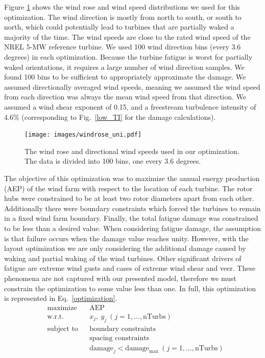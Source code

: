\documentclass[11pt,letterpaper]{article}
\begin{document}
Figure \ref{windrose} shows the wind rose and wind speed distributions we used for this optimization. The wind direction is mostly from north to south, or south to north, which could potentially lead to turbines that are partially waked a majority of the time. The wind speeds are close to the rated wind speed of the NREL 5-MW reference turbine. We used 100 wind direction bins (every 3.6 degrees) in each optimization. Because the turbine fatigue is worst for partially waked orientations, it requires a large number of wind direction samples. We found 100 bins to be sufficient to appropriately approximate the damage. We assumed directionally averaged wind speeds, meaning we assumed the wind speed from each direction was always the mean wind speed from that direction. We assumed a wind shear exponent of 0.15, and a freestream turbulence intensity of 4.6\% (corresponding to Fig.~\ref{low_TI} for the damage calculations).
% 
\begin{figure}
    \centering
    \texttt{[image: images/windrose\_uni.pdf]}
    \caption{The wind rose and directional wind speeds used in our optimization. The data is divided into 100 bins, one every 3.6 degrees.}
    \label{windrose}
\end{figure}


The objective of this optimization was to maximize the annual energy production (AEP) of the wind farm with respect to the location of each turbine. The rotor hubs were constrained to be at least two rotor diameters apart from each other. Additionally there were boundary constraints which forced the turbines to remain in a fixed wind farm boundary. Finally, the total fatigue damage was constrained to be less than a desired value. When considering fatigue damage, the assumption is that failure occurs when the damage value reaches unity. However, with the layout optimization we are only considering the additional damage caused by waking and partial waking of the wind turbines. Other significant drivers of fatigue are extreme wind gusts and cases of extreme wind shear and veer. These phenomena are not captured with our presented model, therefore we must constrain the optimization to some value less than one. In full, this optimization is represented in Eq.~\ref{optimization}.
% 
\begin{equation}
			\begin{aligned}
				& \text{maximize}
					& & \text{AEP} \\
                & \text{w.r.t.} 
                	&& x_j,~ y_j ~ (j = 1, \ldots, \text{nTurbs})\\
				& \text{subject to}
					& & \text{boundary constraints} \\
						&&& \text{spacing constraints} \\
						&&& \text{damage}_j < \text{damage}_\text{max} ~ (j = 1, \ldots, \text{nTurbs})
			\end{aligned}
		\label{optimization}
		\end{equation}
\end{document}
